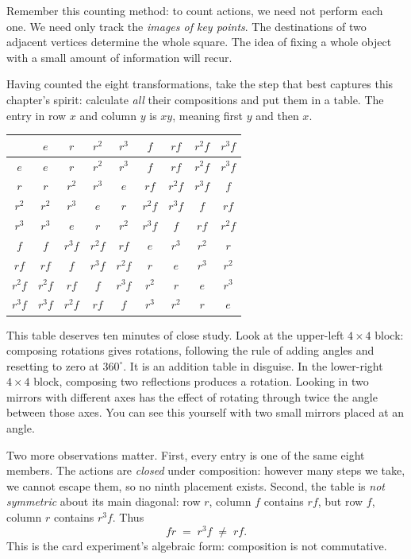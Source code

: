 Remember this counting method: to count actions, we need not perform each one. We need only track the \emph{images of key points}. The destinations of two adjacent vertices determine the whole square. The idea of fixing a whole object with a small amount of information will recur.

Having counted the eight transformations, take the step that best captures this chapter's spirit: calculate \emph{all} their compositions and put them in a table. The entry in row $x$ and column $y$ is $xy$, meaning first $y$ and then $x$.

\begin{table}[htbp]
\centering\small
\begin{tabular}{c|cccc|cccc}
\toprule
 & $e$ & $r$ & $r^2$ & $r^3$ & $f$ & $rf$ & $r^2f$ & $r^3f$\\
\midrule
$e$     & $e$ & $r$ & $r^2$ & $r^3$ & $f$ & $rf$ & $r^2f$ & $r^3f$\\
$r$     & $r$ & $r^2$ & $r^3$ & $e$ & $rf$ & $r^2f$ & $r^3f$ & $f$\\
$r^2$   & $r^2$ & $r^3$ & $e$ & $r$ & $r^2f$ & $r^3f$ & $f$ & $rf$\\
$r^3$   & $r^3$ & $e$ & $r$ & $r^2$ & $r^3f$ & $f$ & $rf$ & $r^2f$\\
\midrule
$f$     & $f$ & $r^3f$ & $r^2f$ & $rf$ & $e$ & $r^3$ & $r^2$ & $r$\\
$rf$    & $rf$ & $f$ & $r^3f$ & $r^2f$ & $r$ & $e$ & $r^3$ & $r^2$\\
$r^2f$  & $r^2f$ & $rf$ & $f$ & $r^3f$ & $r^2$ & $r$ & $e$ & $r^3$\\
$r^3f$  & $r^3f$ & $r^2f$ & $rf$ & $f$ & $r^3$ & $r^2$ & $r$ & $e$\\
\bottomrule
\end{tabular}
\end{table}

This table deserves ten minutes of close study. Look at the upper-left $4\times4$ block: composing rotations gives rotations, following the rule of adding angles and resetting to zero at $360^\circ$. It is an addition table in disguise. In the lower-right $4\times4$ block, composing two reflections produces a rotation. Looking in two mirrors with different axes has the effect of rotating through twice the angle between those axes. You can see this yourself with two small mirrors placed at an angle.

Two more observations matter. First, every entry is one of the same eight members. The actions are \emph{closed} under composition: however many steps we take, we cannot escape them, so no ninth placement exists. Second, the table is \emph{not symmetric} about its main diagonal: row $r$, column $f$ contains $rf$, but row $f$, column $r$ contains $r^3f$. Thus
\[
fr \;=\; r^3 f \;\neq\; rf.
\]
This is the card experiment's algebraic form: composition is not commutative.

